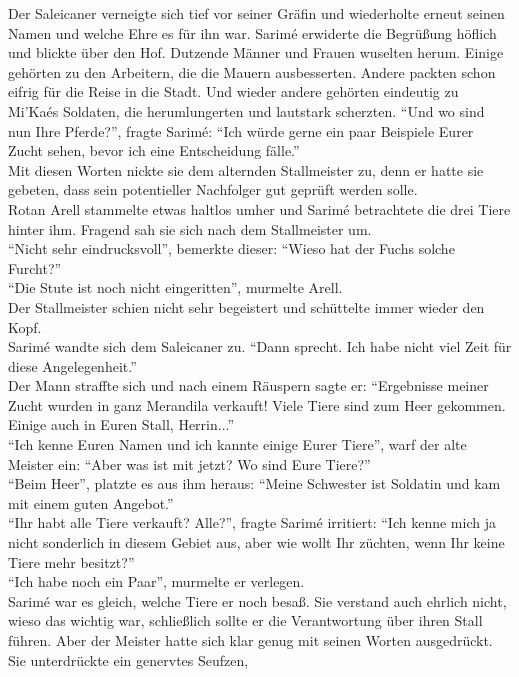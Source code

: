 Der Saleicaner verneigte sich tief vor seiner Gräfin und wiederholte erneut seinen Namen und welche 
Ehre es für ihn war. Sarimé erwiderte die Begrüßung höflich und blickte über den Hof. Dutzende 
Männer und Frauen wuselten herum. Einige gehörten zu den Arbeitern, die die Mauern ausbesserten. 
Andere packten schon eifrig für die Reise in die Stadt. Und wieder andere gehörten eindeutig zu 
Mi'Kaés Soldaten, die herumlungerten und lautstark scherzten. ``Und wo sind nun Ihre Pferde?'', 
fragte Sarimé: ``Ich würde gerne ein paar Beispiele Eurer Zucht sehen, bevor ich eine Entscheidung 
fälle.''\\
Mit diesen Worten nickte sie dem alternden Stallmeister zu, denn er hatte sie gebeten, dass sein 
potentieller Nachfolger gut geprüft werden solle.\\
Rotan Arell stammelte etwas haltlos umher und Sarimé betrachtete die drei Tiere hinter ihm. Fragend 
sah sie sich nach dem Stallmeister um.\\
``Nicht sehr eindrucksvoll'', bemerkte dieser: ``Wieso hat der Fuchs solche Furcht?''\\
``Die Stute ist noch nicht eingeritten'', murmelte Arell.\\
Der Stallmeister schien nicht sehr begeistert und schüttelte immer wieder den Kopf.\\
Sarimé wandte sich dem Saleicaner zu. ``Dann sprecht. Ich habe nicht viel Zeit für diese 
Angelegenheit.''\\
Der Mann straffte sich und nach einem Räuspern sagte er: ``Ergebnisse meiner Zucht wurden in ganz 
Merandila verkauft! Viele Tiere sind zum Heer gekommen. Einige auch in Euren Stall, Herrin...''\\
``Ich kenne Euren Namen und ich kannte einige Eurer Tiere'', warf der alte Meister ein: ``Aber was 
ist mit jetzt? Wo sind Eure Tiere?''\\
``Beim Heer'', platzte es aus ihm heraus: ``Meine Schwester ist Soldatin und kam mit einem guten 
Angebot.''\\
``Ihr habt alle Tiere verkauft? Alle?'', fragte Sarimé irritiert: ``Ich kenne mich ja nicht 
sonderlich in diesem Gebiet aus, aber wie wollt Ihr züchten, wenn Ihr keine Tiere mehr besitzt?''\\
``Ich habe noch ein Paar'', murmelte er verlegen.\\
Sarimé war es gleich, welche Tiere er noch besaß. Sie verstand auch ehrlich nicht, wieso das 
wichtig war, schließlich sollte er die Verantwortung über ihren Stall führen. Aber der Meister 
hatte sich klar genug mit seinen Worten ausgedrückt. Sie unterdrückte ein genervtes Seufzen, 
